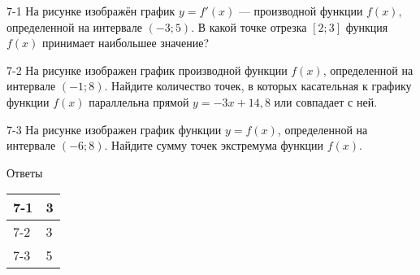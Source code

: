 \documentclass[twocolumn]{article}
\begin{document}
\cleardoublepage
\def\examvart{Вариант 1.0}
\normalsize

\startpartone
\large




\begin{taskBN}{7-1}
На рисунке изображён график $y=f'(x)$ — производной функции $f(x)$, определенной на интервале $(-3;5)$. В какой точке отрезка $[2; 3]$ функция $f(x)$ принимает наибольшее значение?\vspace{2.5cm}
\end{taskBN}

\begin{taskBN}{7-2}
На рисунке изображен график производной функции $f(x)$, определенной на интервале $(-1; 8)$. Найдите количество точек, в которых касательная к графику функции $f(x)$ параллельна прямой $y=-3x+ 14{,}8 $ или совпадает с ней.\vspace{2.5cm}
\end{taskBN}

\begin{taskBN}{7-3}
На рисунке изображен график функции $y=f(x)$, определенной на интервале $(-6;8)$. Найдите сумму точек экстремума функции $f(x)$.\vspace{2.5cm}
\end{taskBN}

\newpage
 Ответы

\begin{table}[h]\begin{tabular}{|l|l|}
\hline
7-1 & 3
\\
\hline
7-2 & 3
\\
\hline
7-3 & 5
\\
\hline
\end{tabular}\end{table}



\newpage
\end{document}
